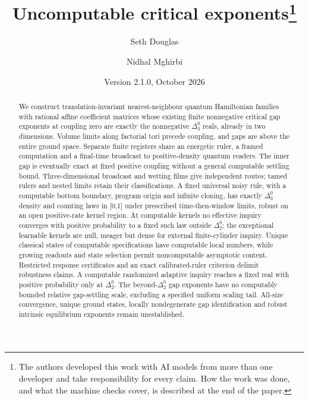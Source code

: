 \documentclass[11pt]{article}
\title{Uncomputable critical exponents\thanks{The authors developed this work with AI models from more than one developer and take responsibility for every claim. How the work was done, and what the machine checks cover, is described at the end of the paper.}}
\author{Seth Douglas \and Nidhal Mghirbi}
\date{Version 2.1.0, October 2026}
\theoremstyle{remark}
\begin{document}
\maketitle
\begin{abstract}
We construct translation-invariant nearest-neighbour quantum Hamiltonian families with rational affine coefficient matrices whose existing finite nonnegative critical gap exponents at coupling zero are exactly the nonnegative $\Delta^0_3$ reals, already in two dimensions. Volume limits along factorial tori precede coupling, and gaps are above the entire ground space. Separate finite registers share an energetic ruler, a framed computation and a final-time broadcast to positive-density quantum readers. The inner gap is eventually exact at fixed positive coupling without a general computable settling bound. Three-dimensional broadcast and wetting films give independent routes; tamed rulers and nested limits retain their classifications. A fixed universal noisy rule, with a computable bottom boundary, program origin and infinite cloning, has exactly $\Delta^0_3$ density and counting laws in [0,1] under prescribed time-then-window limits, robust on an open positive-rate kernel region. At computable kernels no effective inquiry converges with positive probability to a fixed such law outside $\Delta^0_2$; the exceptional learnable kernels are null, meager but dense for external finite-cylinder inquiry. Unique classical states of computable specifications have computable local numbers, while growing readouts and state selection permit noncomputable asymptotic content. Restricted response certificates and an exact calibrated-ruler criterion delimit robustness claims. A computable randomized adaptive inquiry reaches a fixed real with positive probability only at $\Delta^0_2$. The beyond-$\Delta^0_2$ gap exponents have no computably bounded relative gap-settling scale, excluding a specified uniform scaling tail. All-size convergence, unique ground states, locally nondegenerate gap identification and robust intrinsic equilibrium exponents remain unestablished.
\end{abstract}


















\end{document}
